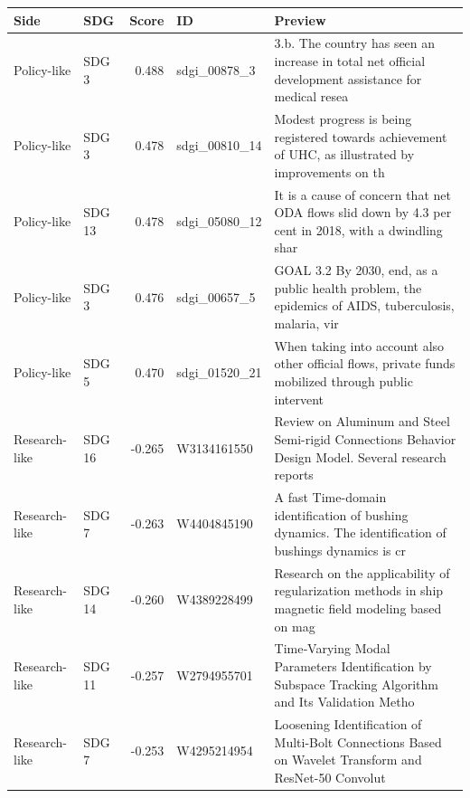 \begin{tabular}{llrp{}p{}}
\toprule
Side & SDG & Score & ID & Preview \\
\midrule
Policy-like & SDG 3 & 0.488 & sdgi\_00878\_3 & 3.b. The country has seen an increase in total net official development assistance for medical resea \\
Policy-like & SDG 3 & 0.478 & sdgi\_00810\_14 & Modest progress is being registered towards achievement of UHC, as illustrated by improvements on th \\
Policy-like & SDG 13 & 0.478 & sdgi\_05080\_12 & It is a cause of concern that net ODA flows slid down by 4.3 per cent in 2018, with a dwindling shar \\
Policy-like & SDG 3 & 0.476 & sdgi\_00657\_5 & GOAL 3.2 By 2030, end, as a public health problem, the epidemics of AIDS, tuberculosis, malaria, vir \\
Policy-like & SDG 5 & 0.470 & sdgi\_01520\_21 & When taking into account also other official flows, private funds mobilized through public intervent \\
\midrule
Research-like & SDG 16 & -0.265 & W3134161550 & Review on Aluminum and Steel Semi-rigid Connections Behavior Design Model. Several research reports  \\
Research-like & SDG 7 & -0.263 & W4404845190 & A fast Time-domain identification of bushing dynamics. The identification of bushings dynamics is cr \\
Research-like & SDG 14 & -0.260 & W4389228499 & Research on the applicability of regularization methods in ship magnetic field modeling based on mag \\
Research-like & SDG 11 & -0.257 & W2794955701 & Time‐Varying Modal Parameters Identification by Subspace Tracking Algorithm and Its Validation Metho \\
Research-like & SDG 7 & -0.253 & W4295214954 & Loosening Identification of Multi-Bolt Connections Based on Wavelet Transform and ResNet-50 Convolut \\
\bottomrule
\end{tabular}
